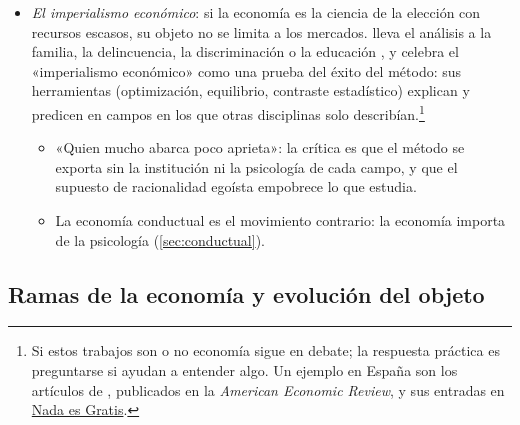 \documentclass[11pt]{article}
\begin{document}
\begin{itemize}
  \begin{itemize}
  \item Volvamos a la pregunta de la reina. Pedir a los economistas que vieran venir la crisis es pedir economía positiva: describir y predecir. Parte de lo que se les reprochó después fue, en cambio, de arte: qué regulación financiera habían aconsejado.
  \end{itemize}
\item \emph{El imperialismo económico}: si la economía es la ciencia de la elección con recursos escasos\nocite{Robbins1932Essay}, su objeto no se limita a los mercados.  lleva el análisis a la familia, la delincuencia, la discriminación o la educación\nocite{Becker1993Economic} , y \textcite{Lazear2000Imperialism} celebra el «imperialismo económico» como una prueba del éxito del método: sus herramientas (optimización, equilibrio, contraste estadístico) explican y predicen en campos en los que otras disciplinas solo describían.\footnote{Si estos trabajos son o no economía sigue en debate; la respuesta práctica es preguntarse si ayudan a entender algo. Un ejemplo en España son los artículos de , publicados en la \emph{American Economic Review}, y sus entradas en \href{https://nadaesgratis.es/category/libertad-gonzalez}{Nada es Gratis}.}
  \begin{itemize}
  \item «Quien mucho abarca poco aprieta»: la crítica es que el método se exporta sin la institución ni la psicología de cada campo, y que el supuesto de racionalidad egoísta empobrece lo que estudia.
  \item La economía conductual es el movimiento contrario: la economía importa de la psicología (\ref{sec:conductual}).
  \end{itemize}
\end{itemize}

\subsection{Ramas de la economía y evolución del objeto}\label{sec:ramas}
\end{document}
